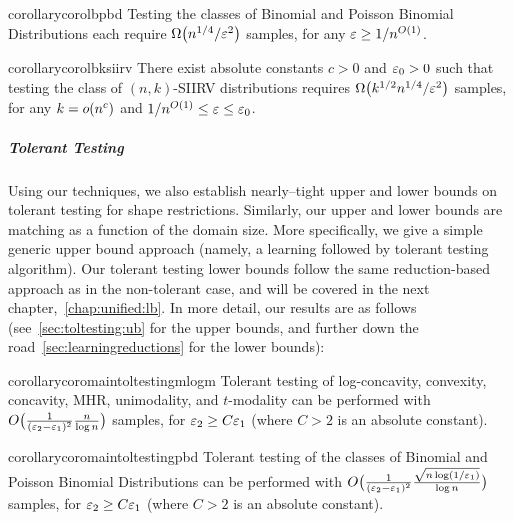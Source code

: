 \begin{restatable}{corollary}{corolbpbd}\label{coro:lb:pbd}
  Testing the classes of Binomial and Poisson Binomial Distributions each require $\bigOmega{{n^{1/4}}/{\eps^2}}$ samples, for any $\varepsilon\geq 1/n^{O(1)}$.
\end{restatable}

\begin{restatable}{corollary}{corolbksiirv}\label{coro:lb:ksiirv}
  There exist absolute constants $c>0$ and $\varepsilon_0 > 0$ such that testing the class of $(n,k)$-SIIRV distributions requires $\Omega\big( k^{1/2}n^{1/4}/\varepsilon^2 \big)$ samples, for any $k=\littleO{n^c}$ and ${1}/{n^{O(1)}} \leq \varepsilon \leq \varepsilon_0$.
\end{restatable}

\subparagraph{Tolerant Testing} 
Using our techniques, we also establish nearly--tight upper and lower bounds on tolerant testing for shape restrictions. 
Similarly, our upper and lower bounds are matching as a function of the domain size.
More specifically, we give a simple generic upper bound approach (namely, a learning followed by tolerant testing algorithm).
Our tolerant testing lower bounds follow the same reduction-based approach as in the non-tolerant case, and will be covered in the next chapter,~\cref{chap:unified:lb}. In more detail, our results are as follows (see~\cref{sec:toltesting:ub} for the upper bounds, and further down the road~\cref{sec:learningreductions} for the lower bounds):

\begin{restatable}{corollary}{coromaintoltestingmlogm}\label{coro:main:tol:testing:mlogm}
Tolerant testing of log-concavity, convexity, concavity, MHR, unimodality, and $t$-modality can be performed with $O\big( \frac{1}{(\varepsilon_2-\varepsilon_1)^2}\frac{n}{\log n} \big)$ samples, for $\varepsilon_2 \geq C \varepsilon_1$ (where $C>2$ is an absolute constant).
\end{restatable}

\begin{restatable}{corollary}{coromaintoltestingpbd}\label{coro:main:tol:testing:pbd}
Tolerant testing of the classes of Binomial and Poisson Binomial Distributions can be performed with $O\big( \frac{1}{(\varepsilon_2-\varepsilon_1)^2}\frac{\sqrt{n\log({1}/{\varepsilon_1})}}{\log n} \big)$ samples, for $\varepsilon_2 \geq C \varepsilon_1$ (where $C>2$ is an absolute constant).
\end{restatable}

